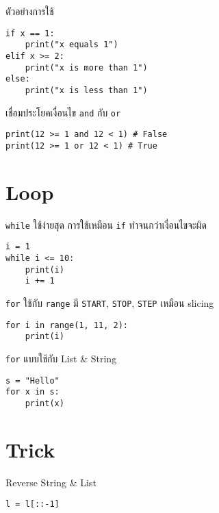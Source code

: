 \documentclass[11pt,a4paper,twocolumn]{article}
\begin{document}
ตัวอย่างการใช้
\vspace{-2.5ex}
\begin{verbatim}
if x == 1:
    print("x equals 1")
elif x >= 2:
    print("x is more than 1")
else:
    print("x is less than 1")
\end{verbatim}
\vspace{-1ex}

เชื่อมประโยคเงื่อนไข \verb|and| กับ \verb|or|
\vspace{-2.5ex}
\begin{verbatim}
print(12 >= 1 and 12 < 1) # False
print(12 >= 1 or 12 < 1) # True
\end{verbatim}
\vspace{-1ex}

\vspace{-2ex}
\section*{Loop}
\vspace{-1ex}

\verb|while| ใช้ง่ายสุด การใช้เหมือน \verb|if| ทำจนกว่าเงื่อนไขจะผิด
\vspace{-2.5ex}
\begin{verbatim}
i = 1
while i <= 10:
    print(i)
    i += 1
\end{verbatim}
\vspace{-1ex}

\verb|for| ใช้กับ \verb|range| มี \verb|START|, \verb|STOP|, \verb|STEP| เหมือน slicing
\vspace{-2.5ex}
\begin{verbatim}
for i in range(1, 11, 2):
    print(i)
\end{verbatim}
\vspace{-1ex}

\verb|for| แบบใช้กับ List \& String
\vspace{-2.5ex}
\begin{verbatim}
s = "Hello"
for x in s:
    print(x)
\end{verbatim}
\vspace{-1ex}

\vspace{-2ex}
\section*{Trick}
\vspace{-1ex}

Reverse String \& List
\vspace{-2.5ex}
\begin{verbatim}
l = l[::-1]
\end{verbatim}
\vspace{-1ex}
\end{document}

